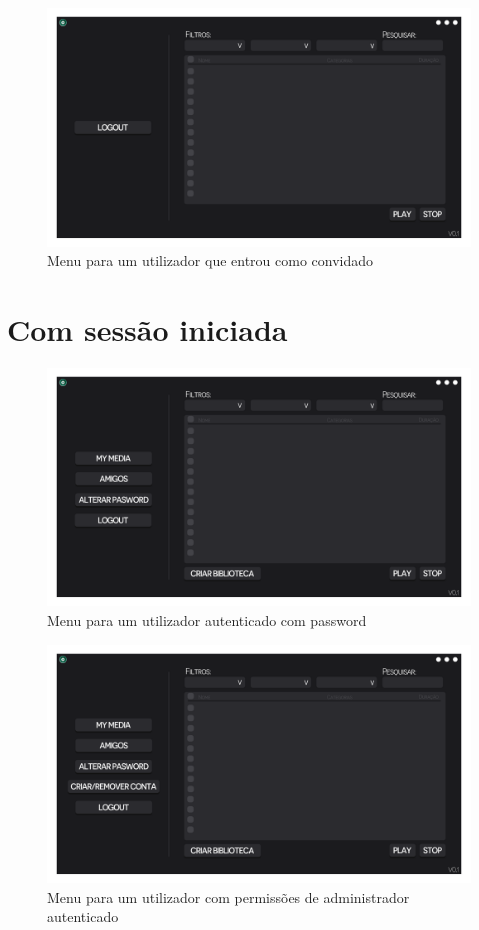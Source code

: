 \documentclass[a4paper]{report}
\begin{document}
\begin{figure}[H]
	\centering 
    \includegraphics[width=\textwidth]{images/Principal_convidado_Menu.png}  
    \caption{Menu para um utilizador que entrou como convidado}
\end{figure}

\section{Com sessão iniciada}
\begin{figure}[H]
	\centering 
    \includegraphics[width=\textwidth]{images/Principal_Menu.png}  
    \caption{Menu para um utilizador autenticado com password}
\end{figure}

\begin{figure}[H]
	\centering 
    \includegraphics[width=\textwidth]{images/Principal_Admin_Menu.png}  
    \caption{Menu para um utilizador com permissões de administrador autenticado}
\end{figure}
\end{document}
